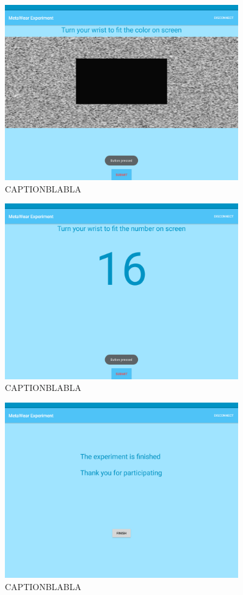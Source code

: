\begin{figure}[h!]
\centering
\includegraphics[width=0.9\textwidth]{figures/tablet_screen15.png}
\caption{CAPTIONBLABLA}
\label{appendix_app_screen_15}
\end{figure}

\begin{figure}[h!]
\centering
\includegraphics[width=0.9\textwidth]{figures/tablet_screen16.png}
\caption{CAPTIONBLABLA}
\label{appendix_app_screen_16}
\end{figure}

\begin{figure}[h!]
\centering
\includegraphics[width=0.9\textwidth]{figures/tablet_screen17.png}
\caption{CAPTIONBLABLA}
\label{appendix_app_screen_17}
\end{figure}

